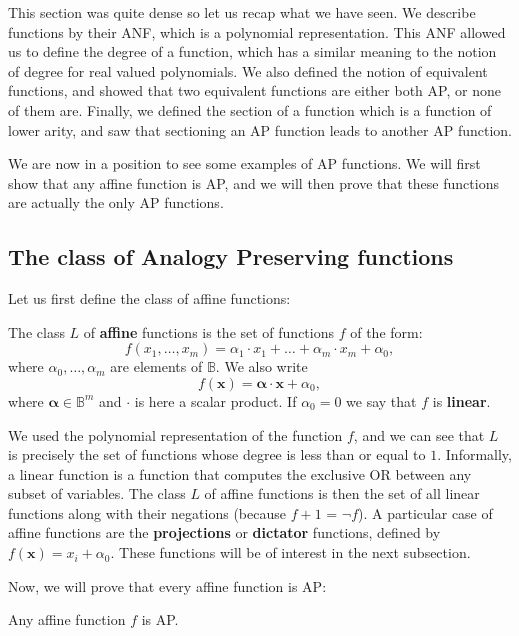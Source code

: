 This section was quite dense so let us recap what we have seen. We
describe functions by their ANF, which is a polynomial representation. This ANF
allowed us to define the degree of a function, which has a similar meaning to
the notion of degree for real valued polynomials. We also defined the notion of
equivalent functions, and showed that two equivalent functions are either both
AP, or none of them are. Finally, we defined the section of a function which is
a function of lower arity, and saw that sectioning an AP function leads to
another AP function.

We are now in a position to see some examples of AP functions. We will first
show that any affine function is AP, and we will then prove that these
functions are actually the only AP functions.

\subsection{The class of Analogy Preserving functions}
\label{SEC:the_class_of_AP_functions}

Let us first define the class of affine functions:
\begin{definition}
  The class $L$ of \textbf{affine} functions is the set of functions $f$ of the
  form:
  $$f(x_1,\ldots , x_m)=\alpha_1\cdot x_1+\ldots +\alpha_m\cdot
  x_m+\alpha_0,$$
  where $\alpha_0,\ldots, \alpha_m$ are elements of $\mathbb{B}$. We also write
  $$f(\mathbf{x}) = \boldsymbol{\alpha} \cdot \mathbf{x} + \alpha_0,$$
  where $\boldsymbol{\alpha} \in \mathbb{B}^m$ and $\cdot$ is here a scalar
  product.  If $\alpha_0= 0$ we say that $f$ is \textbf{linear}.
\end{definition}

We used the polynomial representation of the function $f$, and we can see that
$L$ is precisely the set of functions whose degree is less than or equal to
$1$. Informally, a linear function is a function that computes the exclusive OR
between any subset of variables. The class $L$ of affine functions is then the set of all linear
functions along with their negations (because $f + 1$ = $\neg f$). A particular
case of affine functions are the \textbf{projections} or \textbf{dictator}
functions, defined by $f(\mathbf{x}) = x_i + \alpha_0$. These functions will be
of interest in the next subsection.

Now, we will prove that every affine function is AP:
\begin{proposition}
  \label{PROPOS:affine_functions_are_ap}
  Any affine function $f$ is AP.
\end{proposition}

